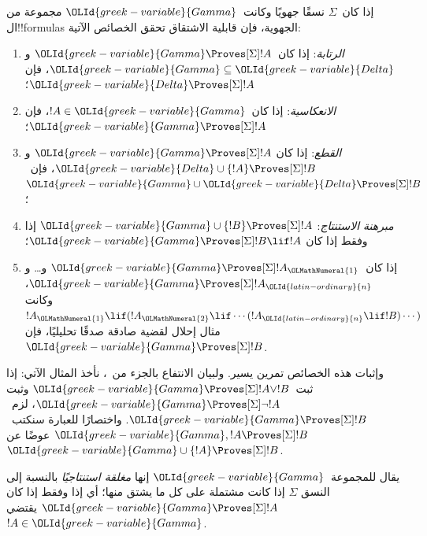 \documentclass[../../../include/open-logic-section]{subfiles}
\begin{document}


\begin{prop}
  إذا كان~$\Sigma$ نسقًا جهويًا وكانت~${\OLId{greek-variable}{Gamma}}$ مجموعة من ال!!{formula}s
  الجهوية، فإن قابلية الاشتقاق تحقق الخصائص الآتية:
  \begin{enumerate}
  \item{} \emph{الرتابة}: إذا
    كان~${\OLId{greek-variable}{Gamma}} \Proves[\Sigma] !A$ و${\OLId{greek-variable}{Gamma}} \subseteq {\OLId{greek-variable}{Delta}}$، فإن
    ${\OLId{greek-variable}{Delta}} \Proves[\Sigma] !A$؛
  \item{}
    \emph{الانعكاسية}: إذا كان~$!A \in {\OLId{greek-variable}{Gamma}}$، فإن
    ${\OLId{greek-variable}{Gamma}} \Proves[\Sigma] !A$؛
  \item{} \emph{القطع}: إذا كان
    ${\OLId{greek-variable}{Gamma}} \Proves[\Sigma] !A$ و${\OLId{greek-variable}{Delta}} \cup \{!A\}
    \Proves[\Sigma] !B$، فإن~${\OLId{greek-variable}{Gamma}} \cup {\OLId{greek-variable}{Delta}} \Proves[\Sigma] !B$؛
  \item{} \emph{مبرهنة الاستنتاج}:
    ${\OLId{greek-variable}{Gamma}} \cup \{!B\} \Proves[\Sigma] !A$ إذا وفقط إذا كان
    ${\OLId{greek-variable}{Gamma}} \Proves[\Sigma] !B \lif !A$؛
  \item {}%
    إذا كان~${\OLId{greek-variable}{Gamma}} \Proves[\Sigma] !A_{\OLMathNumeral{1}}$ و\dots{} و
    ${\OLId{greek-variable}{Gamma}} \Proves[\Sigma] !A_{\OLId{latin-ordinary}{n}}$، وكانت
    $!A_{\OLMathNumeral{1}} \lif (!A_{\OLMathNumeral{2}} \lif \cdots (!A_{\OLId{latin-ordinary}{n}} \lif !B)\cdots)$ مثال إحلال
    لقضية صادقة صدقًا تحليليًا، فإن~${\OLId{greek-variable}{Gamma}} \Proves[\Sigma] !B$.
  \end{enumerate}
\end{prop}

وإثبات هذه الخصائص تمرين يسير. ولبيان الانتفاع بالجزء
 من~،
نأخذ المثال الآتي: إذا ثبت~${\OLId{greek-variable}{Gamma}} \Proves[\Sigma] !A \lor !B$ وثبت
${\OLId{greek-variable}{Gamma}} \Proves[\Sigma] \lnot !A$، لزم~${\OLId{greek-variable}{Gamma}} \Proves[\Sigma] !B$.
واختصارًا للعبارة سنكتب~${\OLId{greek-variable}{Gamma}}, !A \Proves[\Sigma] !B$ عوضًا عن
${\OLId{greek-variable}{Gamma}} \cup \{!A\} \Proves[\Sigma] !B$.

\begin{defn}
  يقال للمجموعة~${\OLId{greek-variable}{Gamma}}$ إنها \emph{مغلقة استنتاجيًا} بالنسبة إلى النسق
  $\Sigma$ إذا كانت مشتملة على كل ما يشتق منها؛ أي إذا وفقط إذا كان
  ${\OLId{greek-variable}{Gamma}} \Proves[\Sigma] !A$ يقتضي $!A \in {\OLId{greek-variable}{Gamma}}$.
\end{defn}
\end{document}
